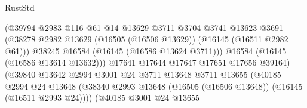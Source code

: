 \begin{lexlean}{RustStd}
\begin{coremodule}
                                            (@39794
                                              @2983
                                              @116
                                              @61
                                              @14
                                              @13629
                                              @3711
                                              @3704
                                              @3741
                                              @13623
                                              @3691
                                              (@38278
                                                @2982
                                                @13629
                                                (@16505 (@16506 @13629))
                                                (@16145 (@16511 @2982 @61)))
                                              @38245
                                              @16584
                                              (@16145 (@16586 @13624 @3711)))
                                            @16584
                                            (@16145 (@16586 @13614 @13632)))
                                          @17641
                                          @17644
                                          @17647
                                          @17651
                                          @17656
                                          @39164)
                                        (@39840
                                          @13642
                                          @2994
                                          @3001
                                          @24
                                          @3711
                                          @13648
                                          @3711
                                          @13655
                                          (@40185
                                            @2994
                                            @24
                                            @13648
                                            (@38340
                                              @2993
                                              @13648
                                              (@16505 (@16506 @13648))
                                              (@16145 (@16511 @2993 @24))))
                                          (@40185
                                            @3001
                                            @24
                                            @13655

\end{coremodule}
\end{lexlean}
